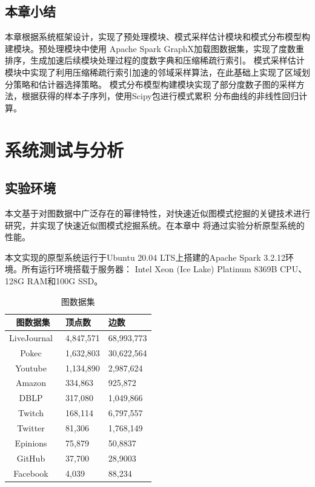 \documentclass[master]{thesis-uestc}
\begin{document}
\section{本章小结}

    本章根据系统框架设计，实现了预处理模块、模式采样估计模块和模式分布模型构建模块。预处理模块中使用
Apache Spark GraphX加载图数据集，实现了度数重排序，生成加速后续模块处理过程的度数字典和压缩稀疏行索引。
模式采样估计模块中实现了利用压缩稀疏行索引加速的邻域采样算法，在此基础上实现了区域划分策略和估计器选择策略。
模式分布模型构建模块实现了部分度数子图的采样方法，根据获得的样本子序列，使用Scipy包进行模式累积
分布曲线的非线性回归计算。

\chapter{系统测试与分析}

\section{实验环境}
\label{sec:exp-env}
    本文基于对图数据中广泛存在的幂律特性，对快速近似图模式挖掘的关键技术进行研究，并实现了快速近似图模式挖掘系统。在本章中
将通过实验分析原型系统的性能。
    
    本文实现的原型系统运行于Ubuntu 20.04 LTS上搭建的Apache Spark 3.2.12环境。所有运行环境搭载于服务器：
Intel Xeon (Ice Lake) Platinum 8369B CPU、128G RAM和100G SSD。
    
\begin{table}[t]
    \centering
    \caption{图数据集}
    \label{tab:datasets}
    \begin{tabular}{c|l|l}
      \hline
      图数据集 & 顶点数 & 边数 \\\hline
      LiveJournal~\cite{CommunityNetworks} & 4,847,571 & 68,993,773\\
      Pokec~\cite{socialNetworks} & 1,632,803 & 30,622,564\\
      Youtube~\cite{networkGroundTruth} &1,134,890&2,987,624\\\hline
      Amazon~\cite{networkGroundTruth} &334,863&925,872\\
      DBLP~\cite{networkGroundTruth} &317,080&1,049,866\\
      Twitch~\cite{TwitchGamer} &168,114&6,797,557\\\hline
      Twitter~\cite{ego} &81,306&1,768,149\\
      Epinions~\cite{SemanticWeb} &75,879&50,8837\\
      GitHub~\cite{MultiScale} &37,700&28,9003\\\hline
      Facebook~\cite{ego} &4,039&88,234\\\hline
    \end{tabular}
\end{table}
\end{document}
